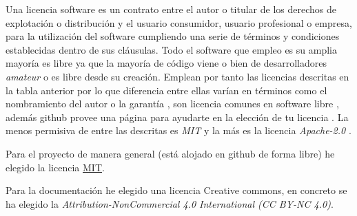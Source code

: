 Una licencia software es un contrato entre el autor o titular de los derechos de explotación o distribución y el usuario consumidor, usuario profesional o empresa, para la utilización del software cumpliendo una serie de términos y condiciones establecidas dentro de sus cláusulas. Todo el software que empleo es su amplia mayoría es libre ya que la mayoría de código viene o bien de desarrolladores \emph{amateur} o es libre desde su creación. Emplean por tanto las licencias descritas en la tabla anterior por lo que diferencia entre ellas varían en términos como el nombramiento del autor o la garantía , son licencia comunes en software libre \cite{githublicense} , además github provee una página para ayudarte en la elección de tu licencia \citep{githubchoose}. La menos permisiva de entre las descritas es \emph{MIT} \citep{mit}  y la más es la licencia \emph{Apache-2.0} \cite{apache}.


Para el proyecto de manera general (está alojado en github de forma libre) he elegido la licencia  \href{https://github.com/aguadotzn/TFM_MUINBDES/blob/master/LICENSE}{MIT}.

Para la documentación he elegido una licencia Creative commons, en concreto se ha elegido la \emph{Attribution-NonCommercial 4.0 International (CC BY-NC 4.0)}.

\label{commons}






